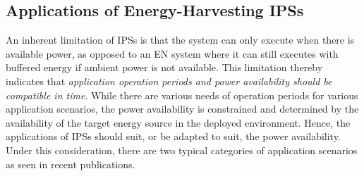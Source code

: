 

\subsection{Applications of Energy-Harvesting IPSs}


An inherent limitation of IPSs is that the system can only execute when there is available power, as opposed to an EN system where it can still executes with buffered energy if ambient power is not available. 
This limitation thereby indicates that \textit{application operation periods and power availability should be compatible in time}. 
While there are various needs of operation periods for various application scenarios, the power availability is constrained and determined by the availability of the target energy source in the deployed environment. 
Hence, the applications of IPSs should suit, or be adapted to suit, the power availability. 
Under this consideration, there are two typical categories of application scenarios as seen in recent publications. 


